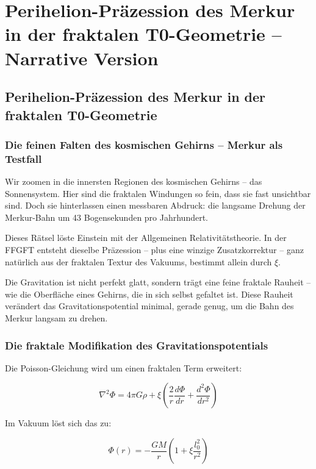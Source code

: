 \chapter{Perihelion-Präzession des Merkur in der fraktalen T0-Geometrie – Narrative Version}


\section{Perihelion-Präzession des Merkur in der fraktalen T0-Geometrie}
	
	\subsection*{Die feinen Falten des kosmischen Gehirns – Merkur als Testfall}
	
	Wir zoomen in die innersten Regionen des kosmischen Gehirns – das Sonnensystem. Hier sind die fraktalen Windungen so fein, dass sie fast unsichtbar sind. Doch sie hinterlassen einen messbaren Abdruck: die langsame Drehung der Merkur-Bahn um 43 Bogensekunden pro Jahrhundert.
	
	Dieses Rätsel löste Einstein mit der Allgemeinen Relativitätstheorie. In der FFGFT entsteht dieselbe Präzession – plus eine winzige Zusatzkorrektur – ganz natürlich aus der fraktalen Textur des Vakuums, bestimmt allein durch $\xi$.
	
	Die Gravitation ist nicht perfekt glatt, sondern trägt eine feine fraktale Rauheit – wie die Oberfläche eines Gehirns, die in sich selbst gefaltet ist. Diese Rauheit verändert das Gravitationspotential minimal, gerade genug, um die Bahn des Merkur langsam zu drehen.
	
	\subsection*{Die fraktale Modifikation des Gravitationspotentials}
	
	Die Poisson-Gleichung wird um einen fraktalen Term erweitert:
	
	\begin{equation}
		\nabla^2 \Phi = 4\pi G \rho + \xi \left( \frac{2}{r} \frac{d\Phi}{dr} + \frac{d^2 \Phi}{dr^2} \right)
	\end{equation}
	
	Im Vakuum löst sich das zu:
	
	\begin{equation}
		\Phi(r) = -\frac{GM}{r} \left( 1 + \xi \frac{l_0^2}{r^2} \right)
	\end{equation}
	
